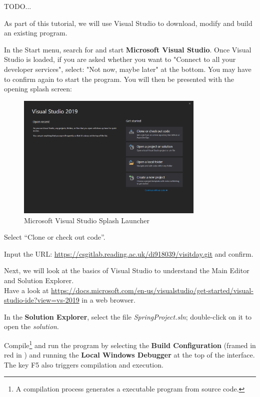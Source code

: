 TODO...


As part of this tutorial, we will use Visual Studio to download, modify and build an existing program.

\begin{steps}
  \item In the Start menu, search for and start \textbf{Microsoft Visual Studio}.
  Once Visual Studio is loaded, if you are asked whether you want to "Connect to all your developer services", select: "Not now, maybe later" at the bottom.
  You may have to confirm again to start the program.
  You will then be presented with the opening splash screen:

  \begin{figure}[H]
      \centering
      \includegraphics[width=0.8\textwidth]{img/splash.png}
      \caption{\label{splash} Microsoft Visual Studio Splash Launcher}
  \end{figure}

  \item Select “Clone or check out code”.
  \item Input the URL: \url{https://csgitlab.reading.ac.uk/di918039/visitday.git} and confirm.
  \item Next, we will look at the basics of Visual Studio to understand the Main Editor and Solution Explorer. \\
  Have a look at \url{https://docs.microsoft.com/en-us/visualstudio/get-started/visual-studio-ide?view=vs-2019} in a web browser.
  \item In the \textbf{Solution Explorer}, select the file {\small \textit{SpringProject.sln}}; double-click on it to open the \textit{solution}.
  \item Compile\footnote{A compilation process generates a executable program from source code.} and run the program by selecting the \textbf{Build Configuration} (framed in red in ) and running the \textbf{Local Windows Debugger} at the top of the interface. The key F5 also triggers compilation and execution.


\end{steps}
